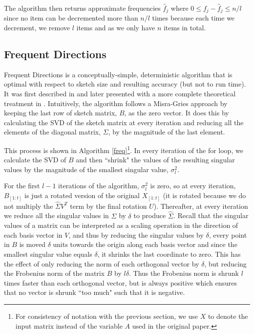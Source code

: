 \documentclass[11pt, oneside]{amsart}
\begin{document}
The algorithm then returns approximate frequencies $\hat{f}_j$ where $0\leq f_j - \hat{f}_j \leq n/l$ since no item can be decremented more than $n/l$ times because each time we decrement, we remove $l$ items and as we only have $n$ items in total.  

\subsection{Frequent Directions}
Frequent Directions is a conceptually-simple, deterministic algorithm that is optimal with respect to sketch size and resulting accuracy (but not to run time). It was first described in \cite{Liberty2013} and later presented with a more complete theoretical treatment in \cite{FreqDirections}. Intuitively, the algorithm follows a Misra-Gries approach by keeping the last row of sketch matrix, $B$, as the zero vector. It does this by calculating the SVD of the sketch matrix at every iteration and reducing all the elements of the diagonal matrix, $\Sigma$, by the magnitude of the last element.

This process is shown in Algorithm \ref{freq}\footnote{For consistency of notation with the previous section, we use $X$ to denote the input matrix instead of the variable $A$ used in the original paper.}. In every iteration of the for loop, we calculate the SVD of $B$ and then ``shrink" the values of the resulting singular values by the magnitude of the smallest singular value, $ \sigma_l^2$. 

For the first $l-1$ iterations of the algorithm, $ \sigma_l^2$ is zero, so at every iteration, $B_{[1:t]}$ is just a rotated version of the original $X_{[1:t]}$ (it is rotated because we do not multiply the $\hat{\Sigma}V^T$ term by the final rotation $U$). Thereafter, at every iteration we reduce all the singular values in $\Sigma$ by $\delta$ to produce $\hat{\Sigma}$. Recall that the singular values of a matrix can be interpreted as a scaling operation in the direction of each basis vector in $V$, and thus by reducing the singular values by $\delta$, every point in $B$ is moved $\delta$ units towards the origin along each basis vector and since the smallest singular value equals $\delta$, it shrinks the last coordinate to zero. This has the effect of only reducing the norm of each orthogonal vector by $\delta$, but reducing the Frobenius norm of the matrix $B$ by $l\delta$. Thus the Frobenius norm is shrunk $l$ times faster than each orthogonal vector, but is always positive which ensures that no vector is shrunk ``too much" such that it is negative. 
\end{document}
